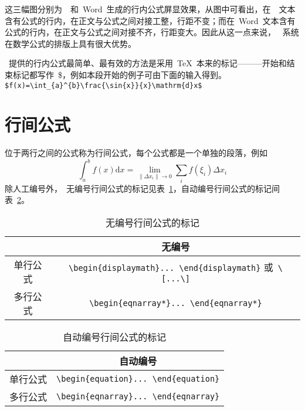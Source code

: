 这三幅图分别为~\XeLaTeX~和~Word~生成的行内公式屏显效果，从图中可看出，在~\XeLaTeX~文本含有公式的行内，在正文与公式之间对接工整，行距不变；而在~Word~文本含有公式的行内，在正文与公式之间对接不齐，行距变大。因此从这一点来说，
\XeLaTeX~系统在数学公式的排版上具有很大优势。

\XeLaTeX~提供的行内公式最简单、最有效的方法是采用~\TeX~本来的标记———开始和结束标记都写作~\$，例如本段开始的例子可由下面的输入得到。
\verb|$f(x)=\int_{a}^{b}\frac{\sin{x}}{x}\mathrm{d}x$|

\section{行间公式}
位于两行之间的公式称为行间公式，每个公式都是一个单独的段落，例如
\[\int_a^b{f\left(x\right)\mathrm{d}x}=\lim_{\left\|\Delta{x_i}\right\|\to 0}\sum_i{f\left(\xi_i\right)\Delta{x_i}}\]
除人工编号外，\XeLaTeX~无编号行间公式的标记见表~\ref{tab:eqtag_1}，自动编号行间公式的标记间表~\ref{tab:eqtag_2}。
\begin{table}[htbp]
\caption{无编号行间公式的标记}\label{tab:eqtag_1}
\vspace{0.5em}\centering\wuhao
\begin{tabularx}{\textwidth}{cc}
\toprule
& 无编号\\
\midrule
单行公式 & \verb|\begin{displaymath}... \end{displaymath}| 或~\verb|\[...\]|\\
多行公式 & \verb|\begin{eqnarray*}... \end{eqnarray*}|\\
\bottomrule
\end{tabularx}
\end{table}

\begin{table}[htbp]
\caption{自动编号行间公式的标记}\label{tab:eqtag_2}
\vspace{0.5em}\centering\wuhao
\begin{tabularx}{\textwidth}{cc}
\toprule
& 自动编号\\
\midrule
单行公式 & \verb|\begin{equation}... \end{equation}|\\
多行公式 & \verb|\begin{eqnarray}... \end{eqnarray}|\\
\bottomrule
\end{tabularx}
\end{table}

